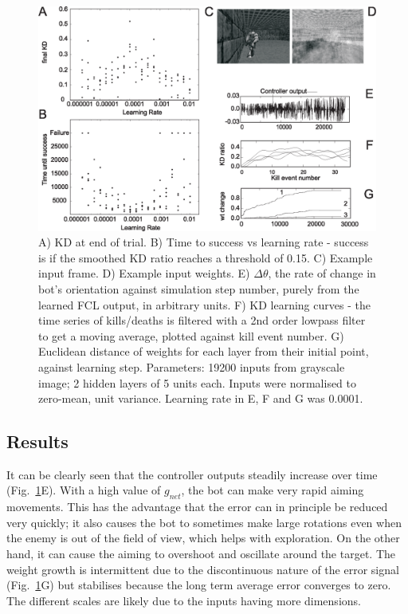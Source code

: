 \documentclass[Afour,sageh,times]{sagej}
\begin{document}
\begin{figure}[!ht]
	\centering \includegraphics[width=\textwidth]{FPSFig7}
	\caption{A) KD at end of trial. B) Time to success vs learning
          rate - success is if the smoothed KD ratio reaches a
          threshold of 0.15. C) Example input frame. D) Example input weights.
          E) $\Delta \theta$, the rate of change in
          bot's orientation against simulation step number, purely
          from the learned FCL output, in arbitrary units. F) KD learning
          curves - the time series of kills/deaths is filtered with a
          2nd order lowpass filter to get a moving average, plotted
          against kill event number. G) Euclidean distance of weights
          for each layer from their initial point, against learning
          step.
          Parameters: 19200 inputs from grayscale image; 2
          hidden layers of 5 units each. Inputs were
          normalised to zero-mean, unit variance. Learning rate in E, F
          and G was 0.0001.
		\label{shooter_results}}
\end{figure}

\subsection{Results}
It can be clearly seen that the controller outputs steadily increase over
time (Fig.~\ref{shooter_results}E). With a high value of $g_{net}$,
the bot can make very rapid aiming movements. This has the advantage
that the error can in principle be reduced very quickly; it also
causes the bot to sometimes make large rotations even when the enemy
is out of the field of view, which helps with exploration. On the
other hand, it can cause the aiming to overshoot and oscillate around
the target. The weight growth is intermittent due to the discontinuous
nature of the error signal (Fig.~\ref{shooter_results}G) but stabilises
because the long term average error converges to zero. The different
scales are likely due to the inputs having more dimensions.
\end{document}
